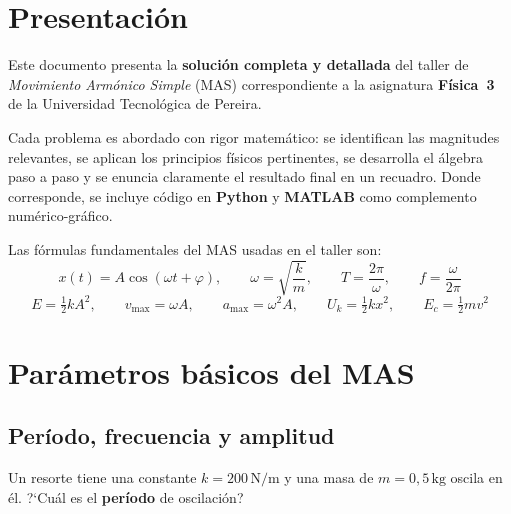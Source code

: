\documentclass[12pt, a4paper, oneside]{book}
\newcommand{\Nm}{\,\text{N/m}}
\newcommand{\kg}{\,\text{kg}}
\begin{document}
\tableofcontents
\clearpage

\chapter*{Presentaci\'on}

Este documento presenta la \textbf{soluci\'on completa y detallada} del taller de
\emph{Movimiento Arm\'onico Simple} (MAS) correspondiente a la asignatura
\textbf{F\'isica~3} de la Universidad Tecnol\'ogica de Pereira.

Cada problema es abordado con rigor matem\'atico: se identifican las magnitudes
relevantes, se aplican los principios f\'isicos pertinentes, se desarrolla el \'algebra
paso a paso y se enuncia claramente el resultado final en un recuadro.
Donde corresponde, se incluye c\'odigo en \textbf{Python} y \textbf{MATLAB}
como complemento num\'erico-gr\'afico.

\medskip
\begin{nota}
Las f\'ormulas fundamentales del MAS usadas en el taller son:
\[
  x(t) = A\cos(\omega t + \varphi),\qquad
  \omega = \sqrt{\dfrac{k}{m}},\qquad
  T = \dfrac{2\pi}{\omega},\qquad
  f = \dfrac{\omega}{2\pi}
\]
\[
  E = \tfrac{1}{2}kA^{2},\qquad
  v_{\max} = \omega A,\qquad
  a_{\max} = \omega^{2}A,\qquad
  U_{k} = \tfrac{1}{2}kx^{2},\qquad
  E_{c} = \tfrac{1}{2}mv^{2}
\]
\end{nota}

\chapter{Par\'ametros b\'asicos del MAS}

\section{Per\'iodo, frecuencia y amplitud}

\begin{problema}[title={Problema~1}]
Un resorte tiene una constante $k = 200\Nm$ y una masa de $m = 0{,}5\kg$ oscila en \'el.
?`Cu\'al es el \textbf{per\'iodo} de oscilaci\'on?
\end{problema}
\end{document}
